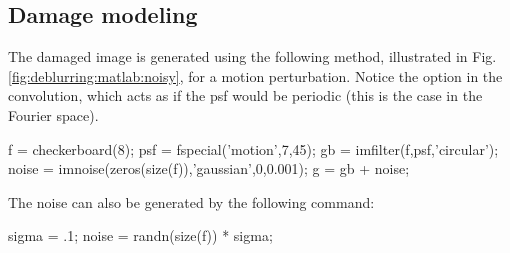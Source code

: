 \def\QRCODE{TB_image_TUT.IMG.image_restoration_deblurring_matlabqrcode.png}
\def\QRPAGE{http://www.iptutorials.science/tree/master/TB_image/TUT.IMG.image_restoration_deblurring/matlab}

\subsection{Damage modeling}

The damaged image is generated using the following method, illustrated in Fig. \ref{fig:deblurring:matlab:noisy}, for a motion perturbation. Notice the  option in the convolution, which acts as if the psf would be periodic (this is the case in the Fourier space).

\begin{matlab}
f = checkerboard(8);
psf = fspecial('motion',7,45);
gb = imfilter(f,psf,'circular');
noise = imnoise(zeros(size(f)),'gaussian',0,0.001);
g = gb + noise;
\end{matlab}

The noise can also be generated by the following command:
\begin{matlab}
sigma = .1;
noise = randn(size(f)) * sigma;
\end{matlab}


